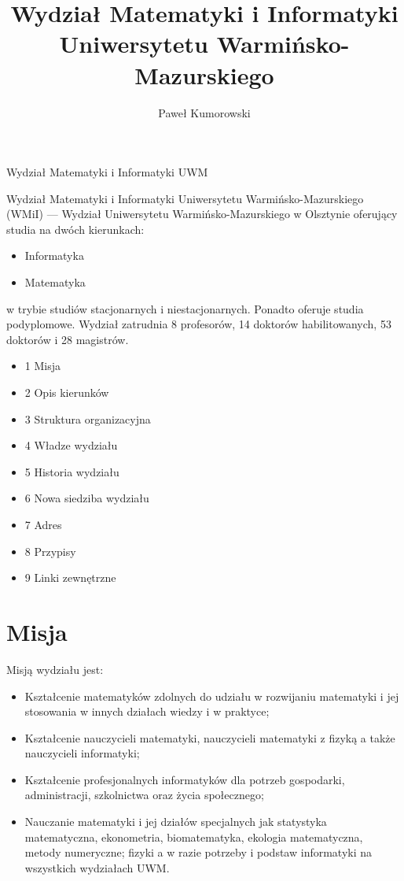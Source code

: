 \documentclass[a4paper,12pt]{article}
\title{Wydział Matematyki i Informatyki Uniwersytetu Warmińsko-Mazurskiego}
\author{Paweł Kumorowski}
\begin{document}
\maketitle
Wydział Matematyki i Informatyki UWM
\begin{abstract}

\end{abstract}
Wydział Matematyki i Informatyki Uniwersytetu Warmińsko-Mazurskiego (WMiI) --- Wydział Uniwersytetu Warmińsko-Mazurskiego w Olsztynie oferujący studia na dwóch kierunkach:
\begin{itemize}
\item Informatyka
\item Matematyka
\end{itemize}
w trybie studiów stacjonarnych i niestacjonarnych. Ponadto oferuje studia podyplomowe.
\newline
Wydział zatrudnia 8 profesorów, 14 doktorów habilitowanych, 53 doktorów i 28 magistrów.
\tableofcontents
\begin{itemize}
\item{1 Misja}
\item{2 Opis kierunków}
\item{3 Struktura organizacyjna}
\item{4 Władze wydziału}
\item{5 Historia wydziału}
\item{6 Nowa siedziba wydziału}
\item{7 Adres}
\item{8 Przypisy}
\item{9 Linki zewnętrzne}
\end{itemize}

\section{Misja}
Misją wydziału jest:
\begin{itemize}
\item{Kształcenie matematyków zdolnych do udziału w rozwijaniu matematyki i jej stosowania w innych
działach wiedzy i w praktyce;}
\item{Kształcenie nauczycieli matematyki, nauczycieli matematyki z fizyką a także nauczycieli informatyki;}
\item{Kształcenie profesjonalnych informatyków dla potrzeb gospodarki, administracji, szkolnictwa oraz życia społecznego;}
\item{Nauczanie matematyki i jej działów specjalnych jak statystyka matematyczna, ekonometria,
biomatematyka, ekologia matematyczna, metody numeryczne; fizyki a w razie potrzeby i podstaw
informatyki na wszystkich wydziałach UWM.}
\end{itemize}
\end{document}
